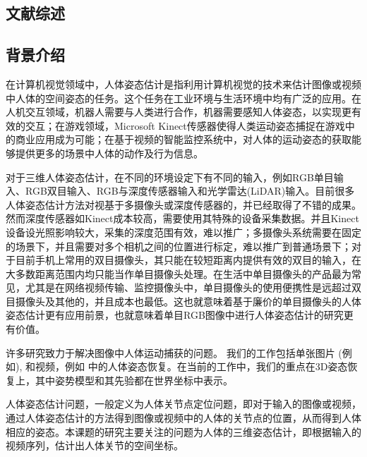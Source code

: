 \cleardoublepage
\begin{refsection}
\chapter{文献综述}

\section{背景介绍}
在计算机视觉领域中，人体姿态估计是指利用计算机视觉的技术来估计图像或视频中人体的空间姿态的任务。这个任务在工业环境与生活环境中均有广泛的应用。在人机交互领域，机器人需要与人类进行合作，机器需要感知人体姿态，以实现更有效的交互；在游戏领域，Microsoft Kinect传感器\autocite{shotton2013efficient}使得人类运动姿态捕捉在游戏中的商业应用成为可能；在基于视频的智能监控系统中，对人体的运动姿态的获取能够提供更多的场景中人体的动作及行为信息。

对于三维人体姿态估计，在不同的环境设定下有不同的输入，例如RGB单目输入、RGB双目输入、RGB与深度传感器输入和光学雷达(LiDAR)输入。目前很多人体姿态估计方法对视基于多摄像头或深度传感器的，并已经取得了不错的成果。然而深度传感器如Kinect\cite{kinect}成本较高，需要使用其特殊的设备采集数据。并且Kinect设备设光照影响较大，采集的深度范围有效，难以推广；多摄像头系统需要在固定的场景下，并且需要对多个相机之间的位置进行标定，难以推广到普通场景下；对于目前手机上常用的双目摄像头，其只能在较短距离内提供有效的双目的输入，在大多数距离范围内均只能当作单目摄像头处理。在生活中单目摄像头的产品最为常见，尤其是在网络视频传输、监控摄像头中，单目摄像头的使用便携性是远超过双目摄像头及其他的，并且成本也最低。这也就意味着基于廉价的单目摄像头的人体姿态估计更有应用前景，也就意味着单目RGB图像中进行人体姿态估计的研究更有价值。

许多研究致力于解决图像中人体运动捕获的问题\cite{moeslund2006survey,sminchisescu20073d,brubaker2010video,deva2011_Book,sarafianos20163d}。
我们的工作包括单张图片 (例如\cite{yang2011articulated,toshev2014deep,chen2014articulated,jain2014learning,tompson2014joint}), 和视频，例如\cite{sapp2011,cherian2014,nie2015joint,park2015articulated,pfister2015flowing,zhang2015human,newell2016stacked} 中的人体姿态恢复。在当前的工作中，我们的重点在3D姿态恢复上，其中姿势模型和其先验都在世界坐标中表示。

人体姿态估计问题，一般定义为人体关节点定位问题，即对于输入的图像或视频，通过人体姿态估计的方法得到图像或视频中的人体的关节点的位置，从而得到人体相应的姿态。本课题的研究主要关注的问题为人体的三维姿态估计，即根据输入的视频序列，估计出人体关节的空间坐标。


\end{refsection}
